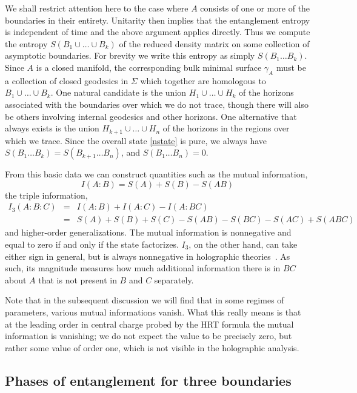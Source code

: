 \documentclass[12pt]{article}
\numberwithin{equation}{section}
\begin{document}
We shall restrict attention here to the case where $A$ consists of one or more of the boundaries in their entirety.  Unitarity then implies that the entanglement entropy is independent of time
and the above argument applies directly.  Thus we compute the entropy $S(B_1 \cup  \ldots  \cup B_k)$ of the reduced density matrix on some collection of asymptotic boundaries.  For brevity we write this entropy as simply $S( B_1 \ldots B_k)$.  Since $A$ is a closed manifold, the corresponding bulk minimal surface $\gamma_A$ must be a collection of closed geodesics in $\Sigma$ which together are homologous to $B_1 \cup  \ldots  \cup B_k$.  One natural candidate is the union $H_1 \cup  \ldots  \cup H_k$ of the horizons associated with the boundaries over which we do not trace, though there will also  be others involving internal geodesics and other horizons. One alternative that always exists is the union $H_{k+1} \cup \ldots \cup H_n$ of the horizons in the regions over which we trace. Since the overall state \eqref{nstate} is pure, we always have $S(B_1 \ldots B_k) = S(B_{k+1} \ldots B_n)$, and $S(B_1 \ldots B_n) = 0$.

From this basic data we can construct quantities such as the mutual information,
%
\begin{equation}
I(A : B) = S(A) + S(B) - S(A B)
\end{equation}
%
the triple information,
%
\begin{eqnarray}
I_3(A : B : C)
&=& I(A : B) + I(A : C) - I(A : B   C) \label{eqn:I3}
\\ &=& S(A) + S(B) + S(C) - S(AB) - S(BC) - S(AC) + S(ABC) \nonumber
\end{eqnarray}
%
and higher-order generalizations. The mutual information is nonnegative and equal to zero if and only if the state factorizes. $I_3$, on the other hand, can take either sign in general, but is always nonnegative in holographic theories~\cite{hayden2013holographic}. As such, its magnitude measures how much additional information there is in $BC$ about $A$ that is not present in $B$ and $C$ separately.

Note that in the subsequent discussion we will find that in some regimes of parameters, various mutual informations vanish. What this really means is that at the leading order in central charge probed by the HRT formula the mutual information is vanishing; we do not expect the value to be precisely zero, but rather some value of order one, which is not visible in the holographic analysis.


\subsection{Phases of entanglement for three boundaries}
\label{p3}
\end{document}
